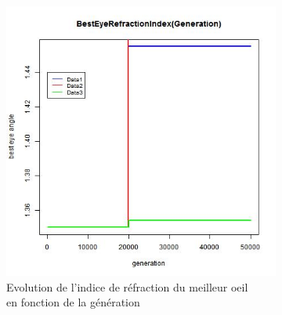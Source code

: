 \documentclass[a4paper,11pt]{article}
\begin{document}
\begin{figure}
\begin{subfigure}{.5\textwidth}
\includegraphics[width=1\linewidth]{best_eye_refraction_index.jpeg}
\caption{Evolution de l'indice de réfraction du meilleur oeil \\en fonction de la génération}
\label{fig:best_8}
\end{subfigure}
\caption{}
\label{fig:test}
\end{figure}

%
\end{document}
